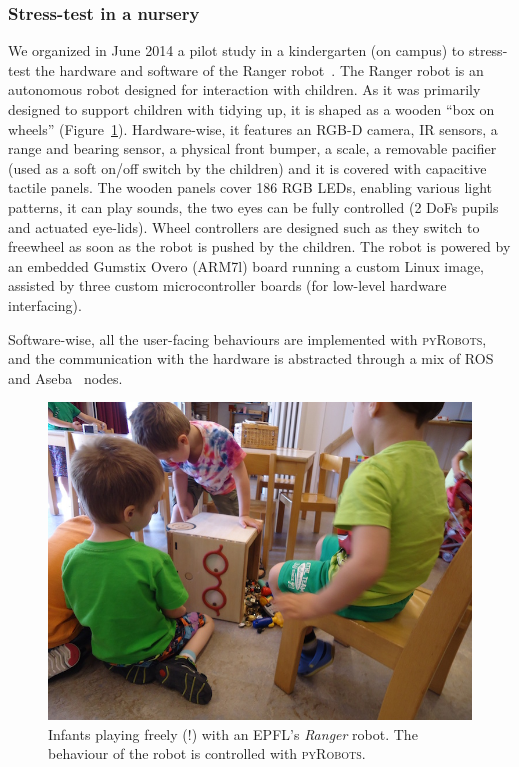 \documentclass[a4paper, 10pt, conference]{ieeeconf}      %
\newcommand{\pyRobots}{\textsc{pyRobots}}
\begin{document}
\subsubsection{Stress-test in a nursery}
\label{croq}

We organized in June 2014 a pilot study in a kindergarten (on campus) to
stress-test the hardware and software of the Ranger
robot~\cite{mondada2014ranger}. The Ranger robot is an autonomous robot designed
for interaction with children. As it was primarily designed to support children
with tidying up, it is shaped as a wooden ``box on wheels''
(Figure~\ref{expe-nursery}). Hardware-wise, it features an RGB-D camera, IR
sensors, a range and bearing sensor, a physical front bumper, a scale, a
removable pacifier (used as a soft on/off switch by the children) and it is
covered with capacitive tactile panels. The wooden panels cover 186 RGB LEDs,
enabling various light patterns, it can play sounds, the two eyes can be fully
controlled (2 DoFs pupils and actuated eye-lids). Wheel controllers are designed
such as they switch to freewheel as soon as the robot is pushed by the children.
The robot is powered by an embedded Gumstix Overo (ARM7l) board running a custom
Linux image, assisted by three custom microcontroller boards (for low-level
hardware interfacing).

Software-wise, all the user-facing behaviours are implemented with \pyRobots{},
and the communication with the hardware is abstracted through a mix of ROS
and Aseba~\cite{magnenat2011aseba} nodes.

\begin{figure}
        \centering
        \includegraphics[width=0.9\columnwidth]{ranger-side}
        \caption{Infants playing freely (!) with an EPFL's \emph{Ranger} robot.
        The behaviour of the robot is controlled with \pyRobots{}.}
        \label{expe-nursery}
\end{figure}
\end{document}
